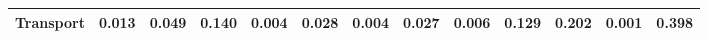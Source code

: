 \begin{table}[htbp]
\begin{tabular}{lcccccccccccc}
  Transport & \textcolor[RGB]{197,127,58}{0.013} & \textcolor[RGB]{103,66,152}{0.049} & \textcolor[RGB]{46,30,209}{0.140} & \textcolor[RGB]{236,152,19}{0.004} & \textcolor[RGB]{140,91,115}{0.028} & \textcolor[RGB]{234,151,21}{0.004} & \textcolor[RGB]{147,95,108}{0.027} & \textcolor[RGB]{227,147,28}{0.006} & \textcolor[RGB]{51,33,204}{0.129} & \textcolor[RGB]{25,16,230}{0.202} & \textcolor[RGB]{250,162,5}{0.001} & \textcolor[RGB]{14,9,241}{0.398} \\ 
   \hline
\end{tabular}
\end{table}
